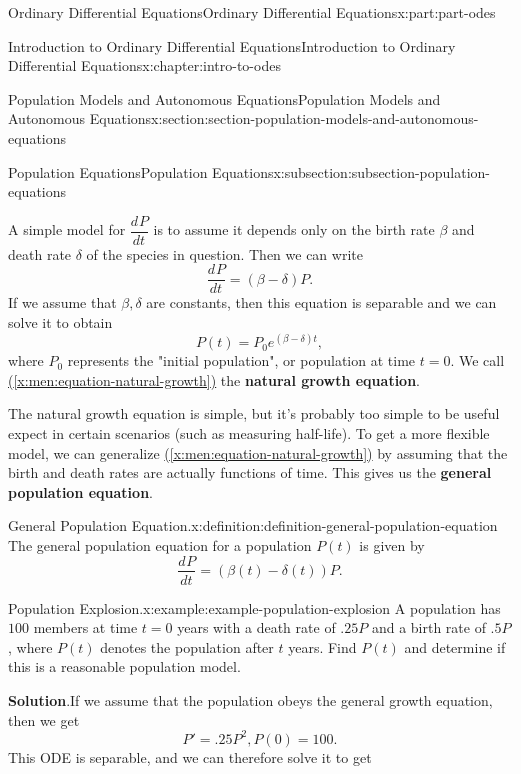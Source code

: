 \documentclass[oneside,10pt,]{book}
\newcommand{\blocktitlefont}{\relax}
\newcommand{\xreffont}{\relax}
\newcommand{\terminology}[1]{\textbf{#1}}
\numberwithin{equation}{part}
\newcommand{\dv}[3][]{\dfrac{d^{#1} #2}{d #3^{#1}}}
\begin{document}
\begin{partptx}{Ordinary Differential Equations}{}{Ordinary Differential Equations}{}{}{x:part:part-odes}
\begin{chapterptx}{Introduction to Ordinary Differential Equations}{}{Introduction to Ordinary Differential Equations}{}{}{x:chapter:intro-to-odes}
\begin{sectionptx}{Population Models and Autonomous Equations}{}{Population Models and Autonomous Equations}{}{}{x:section:section-population-models-and-autonomous-equations}
\begin{subsectionptx}{Population Equations}{}{Population Equations}{}{}{x:subsection:subsection-population-equations}
\par
A simple model for \(\dv{P}{t}\) is to assume it depends only on the birth rate \(\beta\) and death rate \(\delta\) of the species in question. Then we can write%
\begin{equation}
\dv{P}{t} = (\beta - \delta)P.\label{x:men:equation-natural-growth}
\end{equation}
If we assume that \(\beta,\delta\) are constants, then this equation is separable and we can solve it to obtain%
\begin{equation*}
P(t) = P_{0}e^{(\beta - \delta)t},
\end{equation*}
where \(P_{0}\) represents the "initial population", or population at time \(t = 0\). We call \hyperref[x:men:equation-natural-growth]{({\xreffont\ref{x:men:equation-natural-growth}})} the \terminology{natural growth equation}.%
\par
The natural growth equation is simple, but it's probably too simple to be useful expect in certain scenarios (such as measuring half-life). To get a more flexible model, we can generalize \hyperref[x:men:equation-natural-growth]{({\xreffont\ref{x:men:equation-natural-growth}})} by assuming that the birth and death rates are actually functions of time. This gives us the \terminology{general population equation}.%
\begin{definition}{General Population Equation.}{x:definition:definition-general-population-equation}%
The general population equation for a population \(P(t)\) is given by%
\begin{equation*}
\dv{P}{t} = (\beta(t) - \delta(t))P.
\end{equation*}
%
\end{definition}
\begin{example}{Population Explosion.}{x:example:example-population-explosion}%
A population has \(100\) members at time \(t = 0\) years with a death rate of \(.25P\) and a birth rate of \(.5P\), where \(P(t)\) denotes the population after \(t\) years. Find \(P(t)\) and determine if this is a reasonable population model.%
\par\smallskip%
\noindent\textbf{\blocktitlefont Solution}.\hypertarget{g:solution:idp105548780271392}{}\quad{}If we assume that the population obeys the general growth equation, then we get%
\begin{equation*}
P' = .25P^{2}, P(0) = 100.
\end{equation*}
This ODE is separable, and we can therefore solve it to get%
\begin{equation*}

\end{equation*}
\end{example}
\end{subsectionptx}
\end{sectionptx}
\end{chapterptx}
\end{partptx}
\end{document}
